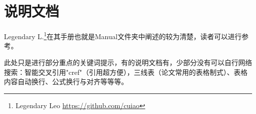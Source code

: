 
\chapter{说明文档}%
Legendary L.\footnote{Legendary Leo \url{https://github.com/cuiao}}在其手册也就是Manual文件夹中阐述的较为清楚，读者可以进行参考。

此处只是进行部分重点的关键词提示，有的说明文档有，少部分没有可以自行网络搜索：智能交叉引用"cref"（引用超方便），三线表（论文常用的表格制式）、表格内容自动换行、公式换行与对齐等等等。
